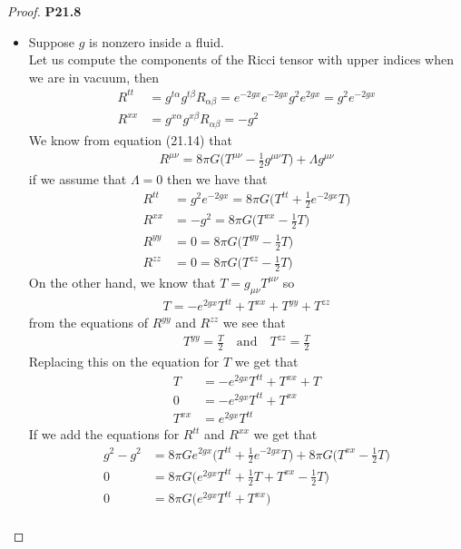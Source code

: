 \documentclass[11pt]{article}
\theoremstyle{definition}
\begin{document}
\begin{proof}{\textbf{P21.8}}
\begin{itemize}
\item [\textbf{f.}] Suppose $g$ is nonzero inside a fluid.\\
Let us compute the components of the Ricci tensor with upper indices
when we are in vacuum, then
\begin{align*}
    R^{tt} &= g^{t\alpha}g^{t\beta}R_{\alpha\beta}
    = e^{-2gx}e^{-2gx}g^2e^{2gx} = g^2e^{-2gx}\\
    R^{xx} &= g^{x\alpha}g^{x\beta}R_{\alpha\beta}
    = -g^2
\end{align*}
We know from equation (21.14) that
\begin{align*}
    R^{\mu\nu} = 8\pi G\bigg(T^{\mu\nu} - \frac{1}{2}g^{\mu\nu} T\bigg) + \Lambda g^{\mu\nu}
\end{align*}
if we assume that $\Lambda = 0$ then we have that
\begin{align*}
    R^{tt} &= g^2 e^{-2gx} = 8\pi G\bigg(T^{tt} + \frac{1}{2}e^{-2gx}T\bigg) \\
    R^{xx} &= -g^2 = 8\pi G\bigg(T^{xx} - \frac{1}{2}T\bigg) \\
    R^{yy} &= 0 = 8\pi G\bigg(T^{yy} - \frac{1}{2}T\bigg) \\
    R^{zz} &= 0 = 8\pi G\bigg(T^{zz} - \frac{1}{2}T\bigg)
\end{align*}
On the other hand, we know that $T = g_{\mu\nu}T^{\mu\nu}$ so
\begin{align*}
    T = -e^{2gx}T^{tt} + T^{xx} + T^{yy} + T^{zz}
\end{align*}
from the equations of $R^{yy}$ and $R^{zz}$ we see that
\begin{align*}
    T^{yy} = \frac{T}{2} \quad\text{and}\quad T^{zz} = \frac{T}{2}
\end{align*}
Replacing this on the equation for $T$ we get that
\begin{align*}
    T &= -e^{2gx}T^{tt} + T^{xx} + T\\
    0 &= -e^{2gx}T^{tt} + T^{xx} \\
    T^{xx} &= e^{2gx}T^{tt}
\end{align*}
If we add the equations for $R^{tt}$ and $R^{xx}$ we get that
\begin{align*}
    g^2 - g^2 &= 8\pi G e^{2gx}\bigg(T^{tt} + \frac{1}{2}e^{-2gx}T\bigg)
    + 8\pi G\bigg(T^{xx} - \frac{1}{2}T\bigg) \\
    0 &= 8\pi G \bigg(e^{2gx}T^{tt} + \frac{1}{2}T + T^{xx} - \frac{1}{2}T\bigg) \\
    0 &= 8\pi G \bigg(e^{2gx}T^{tt} + T^{xx}\bigg) \\

\end{align*}
\end{itemize}
\end{proof}
\end{document}
